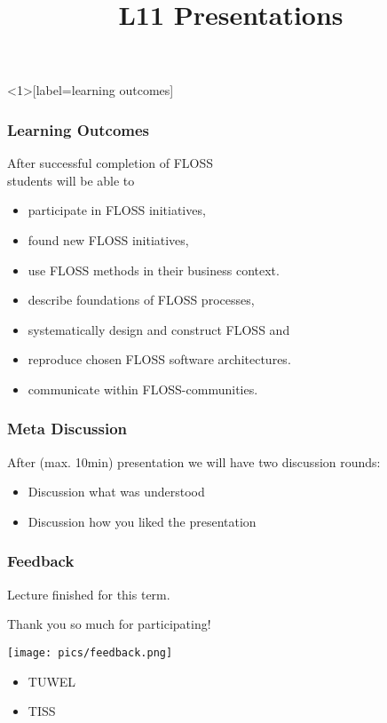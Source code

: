 

\title{L11 Presentations}



\begin{frame}<1>[label=learning outcomes]
	\frametitle{Learning Outcomes}
	After successful completion of FLOSS \\
	students will be able to

	\begin{itemize}
	\item participate in FLOSS initiatives,
	\item found new FLOSS initiatives,
	\item use FLOSS methods in their business context.

	\item describe foundations of FLOSS processes,
	\item systematically design and construct FLOSS and
	\item reproduce chosen FLOSS software architectures.

	\item communicate within FLOSS-communities.
	\end{itemize}
\end{frame}

\begin{frame}
	\frametitle{Meta Discussion}

	After (max. 10min) presentation we will have two discussion rounds:

	\begin{itemize}
	\item Discussion what was understood
	\item Discussion how you liked the presentation
	\end{itemize}
\end{frame}

\begin{frame}
	\frametitle{Feedback}
	Lecture finished for this term.

	Thank you so much for participating!

	\hfill \texttt{[image: pics/feedback.png]}
	\tiny
	\begin{itemize}
		\item TUWEL %
		\item TISS %
	\end{itemize}
\end{frame}


